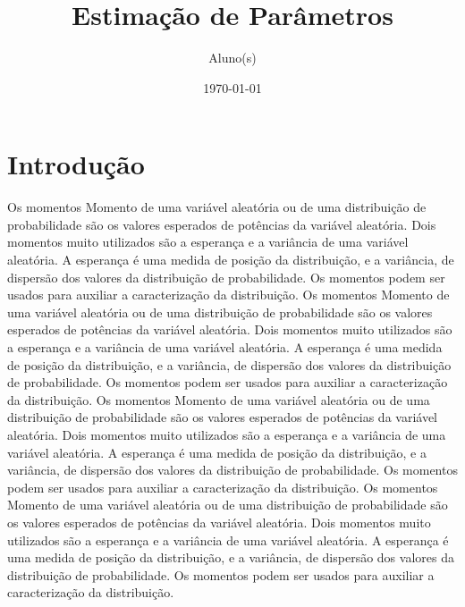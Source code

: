 \documentclass[12pt]{article}
\title{Estimação de Parâmetros}
\author{Aluno(s)}
\date{\today{}}
\begin{document}
\maketitle

\thispagestyle{empty}

\section{Introdução}
Os momentos Momento de uma variável aleatória ou de uma distribuição de probabilidade são os valores esperados de potências da variável aleatória. Dois momentos muito utilizados são a esperança e a variância de uma variável aleatória. A esperança é uma medida de posição da distribuição, e a variância, de dispersão dos valores da distribuição de probabilidade. Os momentos podem ser usados para auxiliar a caracterização da distribuição.
Os momentos Momento de uma variável aleatória ou de uma distribuição de probabilidade são os valores esperados de potências da variável aleatória. Dois momentos muito utilizados são a esperança e a variância de uma variável aleatória. A esperança é uma medida de posição da distribuição, e a variância, de dispersão dos valores da distribuição de probabilidade. Os momentos podem ser usados para auxiliar a caracterização da distribuição.
Os momentos Momento de uma variável aleatória ou de uma distribuição de probabilidade são os valores esperados de potências da variável aleatória. Dois momentos muito utilizados são a esperança e a variância de uma variável aleatória. A esperança é uma medida de posição da distribuição, e a variância, de dispersão dos valores da distribuição de probabilidade. Os momentos podem ser usados para auxiliar a caracterização da distribuição.
Os momentos Momento de uma variável aleatória ou de uma distribuição de probabilidade são os valores esperados de potências da variável aleatória. Dois momentos muito utilizados são a esperança e a variância de uma variável aleatória. A esperança é uma medida de posição da distribuição, e a variância, de dispersão dos valores da distribuição de probabilidade. Os momentos podem ser usados para auxiliar a caracterização da distribuição.
\end{document}

